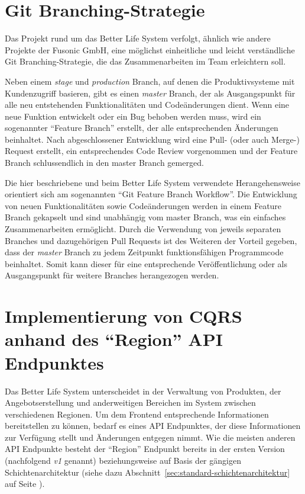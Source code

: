 \documentclass[a4paper,12pt,twoside]{scrreprt}
\begin{document}
\section{Git Branching-Strategie}
\label{sec:git-branching-strategie}
Das Projekt rund um das Better Life System verfolgt, ähnlich wie andere Projekte der Fusonic GmbH, eine möglichst einheitliche und leicht verständliche Git Branching-Strategie, die das Zusammenarbeiten im Team erleichtern soll.

\medskip

Neben einem \textit{stage} und \textit{production} Branch, auf denen die Produktivsysteme mit Kundenzugriff basieren, gibt es einen \textit{master} Branch, der als Ausgangspunkt für alle neu entstehenden Funktionalitäten und Codeänderungen dient. Wenn eine neue Funktion entwickelt oder ein Bug behoben werden muss, wird ein sogenannter \enquote{Feature Branch} erstellt, der alle entsprechenden Änderungen beinhaltet. Nach abgeschlossener Entwicklung wird eine Pull- (oder auch Merge-) Request erstellt, ein entsprechendes Code Review vorgenommen und der Feature Branch schlussendlich in den master Branch gemerged.

\medskip

Die hier beschriebene und beim Better Life System verwendete Herangehensweise orientiert sich am sogenannten \enquote{Git Feature Branch Workflow}. Die Entwicklung von neuen Funktionalitäten sowie Codeänderungen werden in einem Feature Branch gekapselt und sind unabhängig vom master Branch, was ein einfaches Zusammenarbeiten ermöglicht. Durch die Verwendung von jeweils separaten Branches und dazugehörigen Pull Requests ist des Weiteren der Vorteil gegeben, dass der \textit{master} Branch zu jedem Zeitpunkt funktionsfähigen Programmcode beinhaltet. Somit kann dieser für eine entsprechende Veröffentlichung oder als Ausgangspunkt für weitere Branches herangezogen werden. \parencite[]{atlassian_git_2020}

\clearpage

\section{Implementierung von CQRS anhand des \enquote{Region} API Endpunktes}
\label{sec:cqrs-implementierung-region}
Das Better Life System unterscheidet in der Verwaltung von Produkten, der Angebotserstellung und anderweitigen Bereichen im System zwischen verschiedenen Regionen. Um dem Frontend entsprechende Informationen bereitstellen zu können, bedarf es eines API Endpunktes, der diese Informationen zur Verfügung stellt und Änderungen entgegen nimmt. Wie die meisten anderen API Endpunkte besteht der \enquote{Region} Endpunkt bereits in der ersten Version (nachfolgend \textit{v1} genannt) beziehungsweise auf Basis der gängigen Schichtenarchitektur (siehe dazu Abschnitt~\ref{sec:standard-schichtenarchitektur} auf Seite \pageref{sec:standard-schichtenarchitektur}).
\end{document}
